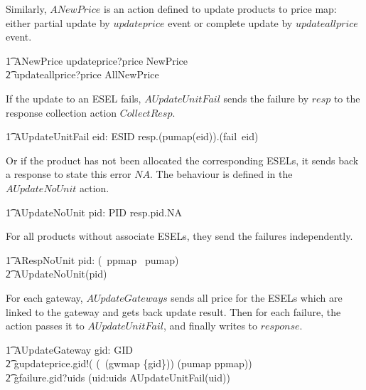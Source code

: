 Similarly, $ANewPrice$ is an action defined to update products to price map: either partial update by $updateprice$ event or complete update by $updateallprice$ event.
\begin{circusaction}
        \t1 ANewPrice \circdef updateprice?price \then \lschexpract NewPrice \rschexpract \\
            \t2 \extchoice updateallprice?price \then \lschexpract AllNewPrice \rschexpract \\
\end{circusaction}

If the update to an ESEL fails, $AUpdateUnitFail$ sends the failure by $resp$ to the response collection action $CollectResp$.
\begin{circusaction}
        \t1 AUpdateUnitFail \circdef  eid: ESID \circspot resp.(pumap(eid)).(fail~eid) \then \Skip \\ 
\end{circusaction}

Or if the product has not been allocated the corresponding ESELs, it sends back a response to state this error $NA$. The behaviour is defined in the $AUpdateNoUnit$ action. 
\begin{circusaction}
        \t1 AUpdateNoUnit \circdef  pid: PID \circspot resp.pid.NA \then \Skip \\ 
\end{circusaction}

For all products without associate ESELs, they send the failures independently. 
\begin{circusaction}
        \t1 ARespNoUnit \circdef \Interleave pid: (\dom~ppmap \setminus \ran~pumap) \linter \emptyset \rinter \circspot \\
        \t2 AUpdateNoUnit(pid) \\ 
\end{circusaction}

For each gateway, $AUpdateGateways$ sends all price for the ESELs which are linked to the gateway and gets back update result. Then for each failure, the action passes it to $AUpdateUnitFail$, and finally writes to $response$.
\begin{circusaction}
    \t1 AUpdateGateway \circdef  gid: GID \circspot \\
        \t2 gupdateprice.gid!( (\dom~(gwmap \rres \{gid\})) \dres (pumap \comp ppmap)) \then \\
        \t2 gfailure.gid?uids \then (\Interleave uid:uids \linter \emptyset \rinter \circspot AUpdateUnitFail(uid)) \\ 
\end{circusaction}


